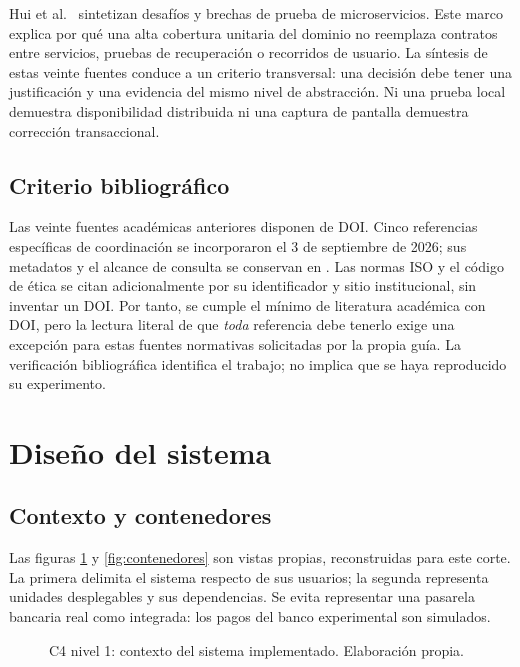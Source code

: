 \documentclass[12pt,a4paper]{article}
\newcommand{\seccion}[1]{\section{#1}}
\begin{document}
Hui et al.\ \cite{hui2025unveiling} sintetizan desafíos y brechas de prueba de microservicios. Este marco explica por qué una alta cobertura unitaria del dominio no reemplaza contratos entre servicios, pruebas de recuperación o recorridos de usuario. La síntesis de estas veinte fuentes conduce a un criterio transversal: una decisión debe tener una justificación y una evidencia del mismo nivel de abstracción. Ni una prueba local demuestra disponibilidad distribuida ni una captura de pantalla demuestra corrección transaccional.

\subsection{Criterio bibliográfico}
Las veinte fuentes académicas anteriores disponen de DOI. Cinco referencias específicas de coordinación se incorporaron el 3 de septiembre de 2026; sus metadatos y el alcance de consulta se conservan en . Las normas ISO y el código de ética se citan adicionalmente por su identificador y sitio institucional, sin inventar un DOI. Por tanto, se cumple el mínimo de literatura académica con DOI, pero la lectura literal de que \emph{toda} referencia debe tenerlo exige una excepción para estas fuentes normativas solicitadas por la propia guía. La verificación bibliográfica identifica el trabajo; no implica que se haya reproducido su experimento.

\seccion{Diseño del sistema}
\subsection{Contexto y contenedores}
Las figuras \ref{fig:contexto} y \ref{fig:contenedores} son vistas propias, reconstruidas para este corte. La primera delimita el sistema respecto de sus usuarios; la segunda representa unidades desplegables y sus dependencias. Se evita representar una pasarela bancaria real como integrada: los pagos del banco experimental son simulados.

\begin{figure}[H]\centering
{}
\caption{C4 nivel 1: contexto del sistema implementado. Elaboración propia.}\label{fig:contexto}
\end{figure}
\end{document}
